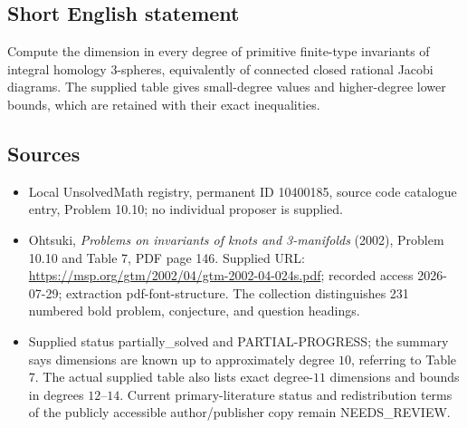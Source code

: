 \documentclass[11pt]{article}
\begin{document}
\subsection{Short English statement}
Compute the dimension in every degree of primitive finite-type invariants of integral homology \(3\)-spheres, equivalently of connected closed rational Jacobi diagrams. The supplied table gives small-degree values and higher-degree lower bounds, which are retained with their exact inequalities.
\subsection{Sources}
\begin{itemize}
\item Local UnsolvedMath registry, permanent ID 10400185, source code catalogue entry, Problem 10.10; no individual proposer is supplied.
\item Ohtsuki, \emph{Problems on invariants of knots and 3-manifolds} (2002), Problem 10.10 and Table 7, PDF page 146. Supplied URL: \url{https://msp.org/gtm/2002/04/gtm-2002-04-024s.pdf}; recorded access 2026-07-29; extraction pdf-font-structure. The collection distinguishes 231 numbered bold problem, conjecture, and question headings.
\item Supplied status partially\_solved and PARTIAL-PROGRESS; the summary says dimensions are known up to approximately degree \(10\), referring to Table 7. The actual supplied table also lists exact degree-\(11\) dimensions and bounds in degrees \(12\)--\(14\). Current primary-literature status and redistribution terms of the publicly accessible author/publisher copy remain NEEDS\_REVIEW.
\end{itemize}
\end{document}
